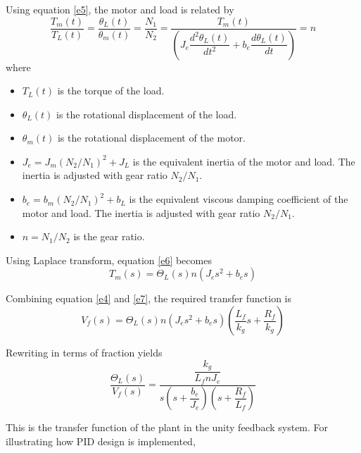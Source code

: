 Using equation \ref{e5}, the motor and load is related by
\begin{equation}\label{e6}
	\dfrac{T_m(t)}{T_L(t)} = \dfrac{\theta_L(t)}{\theta_m(t)} = \dfrac{N_1}{N_2} = \dfrac{T_m(t)}{\left(J_e\dfrac{d^2\theta_L(t)}{dt^2} + b_e\dfrac{d\theta_L(t)}{dt}\right)} = n
\end{equation}
where
\begin{itemize}
	\item $ T_L(t) $ is the torque of the load.
	\item $ \theta_L(t) $ is the rotational displacement of the load.
	\item $ \theta_m(t) $ is the rotational displacement of the motor.
	\item $ J_e = J_m\left({N_2}/{N_1}\right)^2+J_L $ is the equivalent inertia of the motor and load. The inertia is adjusted with gear ratio $ N_2/N_1 $.
	\item $ b_e = b_m\left({N_2}/{N_1}\right)^2+b_L $ is the equivalent viscous damping coefficient of the motor and load. The inertia is adjusted with gear ratio $ N_2/N_1 $.
	\item $ n = N_1/N_2 $ is the gear ratio.
\end{itemize}

Using Laplace transform, equation \ref{e6} becomes
\begin{equation}\label{e7}
T_m(s) = \Theta_L(s) n\left(J_es^2 + b_es\right)
\end{equation}

Combining equation \ref{e4} and \ref{e7}, the required transfer function is
\begin{equation}\label{e8}
	V_f(s) = \Theta_L(s) n\left(J_es^2 + b_es\right)\left(\dfrac{L_f}{k_g}s + \dfrac{R_f}{k_g}\right)
\end{equation}

Rewriting in terms of fraction yields
\begin{equation}\label{e9}
\dfrac{\Theta_L(s)}{V_f(s)} = \dfrac{\dfrac{k_g}{L_fnJ_e}}{s\left(s+\dfrac{b_e}{J_e}\right)\left(s + \dfrac{R_f}{L_f}\right)}
\end{equation}

This is the transfer function of the plant in the unity feedback system. For illustrating how PID design is implemented, 

